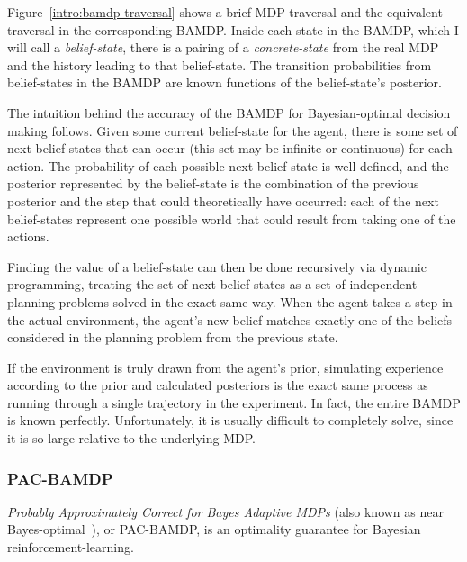 Figure~\ref{intro:bamdp-traversal} shows a brief MDP traversal and the equivalent traversal in the corresponding BAMDP. Inside each state in the BAMDP, which I will call a \emph{belief-state}, there is a pairing of a \emph{concrete-state} from the real MDP and the history leading to that belief-state. The transition probabilities from belief-states in the BAMDP are known functions of the belief-state's posterior.

The intuition behind the accuracy of the BAMDP for Bayesian-optimal decision making follows. Given some current belief-state for the agent, there is some set of next belief-states that can occur (this set may be infinite or continuous) for each action. The probability of each possible next belief-state is well-defined, and the posterior represented by the belief-state is the combination of the previous posterior and the step that could theoretically have occurred: each of the next belief-states represent one possible world that could result from taking one of the actions.


Finding the value of a belief-state can then be done recursively via dynamic programming, treating the set of next belief-states as a set of independent planning problems solved in the exact same way. When the agent takes a step in the actual environment, the agent's new belief matches exactly one of the beliefs considered in the planning problem from the previous state.

If the environment is truly drawn from the agent's prior, simulating experience according to the prior and calculated posteriors is the exact same process as running through a single trajectory in the experiment. In fact, the entire BAMDP is known perfectly. Unfortunately, it is usually difficult to completely solve, since it is so large relative to the underlying MDP. 

\subsubsection{PAC-BAMDP}

\emph{Probably Approximately Correct for Bayes Adaptive MDPs} (also known as near Bayes-optimal~\cite{kolter09}), or PAC-BAMDP, is an optimality guarantee for Bayesian reinforcement-learning. 

